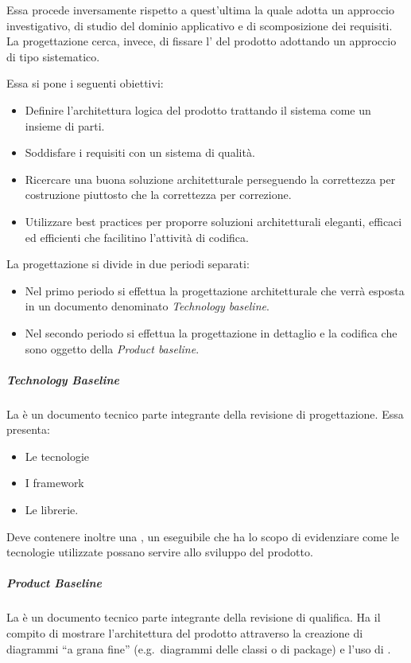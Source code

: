 \documentclass[../../norme-di-progetto.tex]{subfiles}
\begin{document}
Essa procede inversamente rispetto a quest'ultima la quale adotta un approccio investigativo, di studio del dominio applicativo e di scomposizione dei requisiti.
La progettazione cerca, invece, di fissare l' del prodotto adottando un approccio di tipo sistematico.

Essa si pone i seguenti obiettivi:
\begin{itemize}
  \item Definire l'architettura logica del prodotto trattando il sistema come un insieme di parti.
  \item Soddisfare i requisiti con un sistema di qualità.
  \item Ricercare una buona soluzione architetturale perseguendo la correttezza per costruzione piuttosto che la correttezza per correzione.
  \item Utilizzare best practices per proporre soluzioni architetturali eleganti, efficaci ed efficienti che facilitino l'attività di codifica.
\end{itemize}
La progettazione si divide in due periodi separati:
\begin{itemize}
  \item Nel primo periodo si effettua la progettazione architetturale che verrà esposta in un documento denominato \textit{Technology baseline}.
  \item Nel secondo periodo si effettua la progettazione in dettaglio e la codifica che sono oggetto della \textit{Product baseline}.
\end{itemize}

\subparagraph{Technology Baseline}%
\label{subp:technology_baseline}
La  è un documento tecnico parte integrante della revisione di progettazione. Essa presenta:

\begin{itemize}
  \item Le tecnologie
  \item I framework
  \item Le librerie.
\end{itemize}
Deve contenere inoltre una , un eseguibile che ha lo scopo di evidenziare come le tecnologie utilizzate possano servire allo sviluppo del prodotto.

\subparagraph{Product Baseline}%
\label{subp:product_baseline}
La  è un documento tecnico parte integrante della revisione di qualifica.
Ha il compito di mostrare l'architettura del prodotto attraverso la creazione di diagrammi ``a grana fine'' (e.g.\ diagrammi delle classi o di package) e l'uso di .
\end{document}
